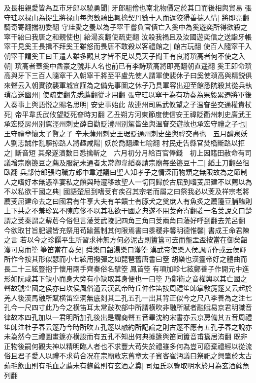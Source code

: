 及長相親愛皆為互市牙郎以驍勇聞|{
	牙郎駔儈也南北物價定於其口而後相與貿易}
張守珪以禄山為捉生將禄山每與數騎出輒擒契丹數十人而返狡猾善揣人情|{
	將即亮翻騎奇寄翻揣初委翻}
守珪愛之養以為子窣干嘗負官債亡入奚中為奚遊奕所得欲殺之窣干紿曰我唐之和親使也|{
	紿湯亥翻使疏吏翻}
汝殺我禍且及汝國遊奕信之送詣牙帳窣干見奚王長揖不拜奚王雖怒而畏唐不敢殺以客禮館之|{
	館古玩翻}
使百人隨窣干入朝窣干謂奚王曰王遣人雖多觀其才皆不足以見天子聞王有良將瑣高者何不使之入朝|{
	瑣高者蓋奚中酋豪之號非人名也前已有李詩瑣高將即亮翻朝直遥翻}
奚王即命瑣高與牙下三百人隨窣干入朝窣干將至平盧先使人謂軍使裴休子曰奚使瑣高與精鋭俱來聲云入朝實欲襲軍城宜謹為之備先事圖之休子乃具軍容出迎至館悉阬殺其從兵執瑣高送幽州|{
	使疏吏翻先悉薦翻從才用翻}
張守珪以窣干為有功奏為果毅累遷將軍後入奏事上與語悦之賜名思明|{
	安史事始此}
故連州司馬武攸望之子温眘坐交通權貴杖死|{
	帝平韋氏武攸望貶死眘時刃翻}
乙丑朔方河東節度使信安王禕貶衢州刺史廣武王承宏貶房州别駕涇州刺史薛自勸貶澧州别駕皆坐與温眘交遊故也承宏守禮之子也|{
	王守禮章懷太子賢之子}
辛未蒲州刺史王琚貶通州刺史坐與禕交書也　五月醴泉妖人劉志誠作亂驅掠路人將趣咸陽|{
	妖於喬翻趣七喻翻}
村民走告縣官焚橋斷路以拒之|{
	斷音短}
其衆遂潰數日悉擒斬之　六月初分月給百官俸錢　初上因籍田赦命有司議增宗廟籩豆之薦及服紀未通者太常卿韋縚奏請宗廟每坐籩豆十二|{
	縚土刀翻坐徂臥翻}
兵部侍郎張均職方郎中韋述議曰聖人知孝子之情深而物類之無限故為之節制人之嗜好本無憑凖宴私之饌與時遷移故聖人一切同歸於古屈到嗜芰屈建不以薦以為不以私欲干國之典|{
	國語楚屈到嗜芰有疾召其宗老而屬之曰祭我必以芰及祥宗老將薦芰屈建命去之曰國君有牛享大夫有羊饋士有豚犬之奠庶人有魚炙之薦籩豆脯醢則上下共之不羞珍異不陳庶侈不以其私欲干國之典遂不用芰奇寄翻菱一名芰說文曰楚謂之芰秦謂之薢茩今俗但言蓤芰武陵記四角三角曰芰兩角曰蓤好呼到翻去羌呂翻}
今欲取甘旨肥濃皆充祭用苟踰舊制其何限焉書曰黍稷非馨明德惟馨|{
	書成王命君陳之言}
若以今之珍饌平生所習求神無方何必泥古則簠簋可去而盤盂盃按當在御矣韶濩可息而箜箏笛當在奏矣|{
	舜樂曰韶湯樂曰濩箜漢武帝使樂人侯調所作或云侯輝所作今按其形似瑟而小七絃用撥彈之如琵琶舊唐書曰箜胡樂也漢靈帝好之體曲而長二十三絃豎抱于懷用兩手齊奏俗名擘箜鳳首箜有項加軫七絃鄭善子作開元中進形如阮咸其下缺小而身大旁有小缺取其身便也一曰箜乃鄭衛之音權輿以其亡國之聲故號空國之侯亦曰坎侯風俗通云漢武帝時丘仲作笛按周禮笙師掌敎箎篴又云起於羌人後漢馬融所賦横笛空洞無底剡其二孔五孔一出其背正似今之尺八李善為之注七孔今一尺四寸此乃今之横笛耳太常鼔吹部中所謂横吹非融所賦者融賦易京君明識音律故本四孔加以一君明所加孔後出是謂商聲五音畢沈約宋書亦云京房備其五音周禮笙師注杜子春云篴乃今時所吹五孔篴以融約所記論之則古篴不應有五孔子春之說亦未為然今三禮圖畫篴亦横設而有五孔不知出何典據篴與笛同簠音甫簋居洧翻}
既非正物後嗣何觀夫神以精明臨人者也不求豐大苟失於禮雖多何為豈可廢棄禮經以從流俗且君子愛人以禮不求苟合况在宗廟敢忘舊章太子賓客崔沔議曰祭祀之興肇於太古茹毛飲血則有毛血之薦未有麴糵則有玄酒之奠|{
	司烜氏以鑒取明水於月為玄酒糵魚列翻}
